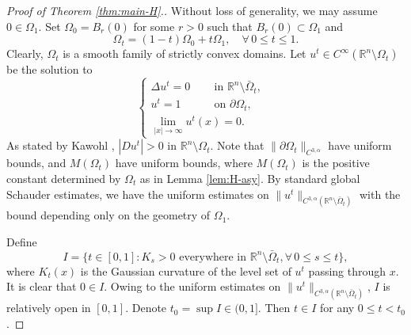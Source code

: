 \documentclass[reqno]{amsart}
\theoremstyle{remark}
\theoremstyle{definition}
\numberwithin{equation}{section}
\begin{document}
\begin{proof}[Proof of Theorem \ref{thm:main-H}.]
	Without loss of generality, we may assume $0\in\Omega_1$. Set $\Omega_0=B_{r}(0)$ for some $r>0$ such that $B_r(0) \subset \Omega_1$ and
	$$\Omega_t=(1-t)\Omega_0+t\Omega_1,\quad\forall\, 0\leq t\leq1.$$
	Clearly, $\Omega_t$ is a smooth family of strictly convex domains.
	Let $u^t\in C^\infty(\mathbb{R}^n\setminus\Omega_t)$ be the solution to 
	\begin{equation*}
		\begin{cases}
			\Delta u^t=0  \,\qquad\text{in }\mathbb{R} ^n\setminus\bar{\Omega}_t, \\
			u^t=1 \quad\quad\quad \text{on }\partial\Omega_t, \\
			\lim\limits_{|x|\to\infty}u^t(x)=0. &
		\end{cases}
	\end{equation*}
	As stated by Kawohl \cite{Kawohl-1988}, $|Du^t|>0$ in $\mathbb{R}^n\setminus\Omega_t$. Note that $\|\partial\Omega_t\|_{C^{3,\alpha}}$ have uniform bounds, and $M(\Omega_t)$ have uniform bounds, where $M(\Omega_t)$ is the positive constant determined by $\Omega_t$ as in Lemma \ref{lem:H-asy}. By standard global Schauder estimates, we have the uniform estimates on $\|u^t\|_{C^{3,\alpha}(\mathbb{R}^n\setminus\bar{\Omega}_t)}$ with the bound depending only on the geometry of $\Omega_1$.

	Define
	$$I = \{ t \in [0,1]: K_s > 0 \text{ everywhere in } \mathbb{R}^n\setminus\bar{\Omega}_t, \forall\, 0\leq s\leq t  \},$$
	where $K_t(x)$ is the Gaussian curvature of the level set of $u^t$ passing through $x$. It is clear that $0 \in I$. Owing to the uniform estimates on $\|u^t\|_{C^{3,\alpha}(\mathbb{R}^n\setminus\bar{\Omega}_t)}$,  $I$ is relatively open in $[0,1]$. Denote $t_0=\sup I\in(0,1]$. Then $t\in I$ for any $0\leq t<t_0$.


\end{proof}
\end{document}

